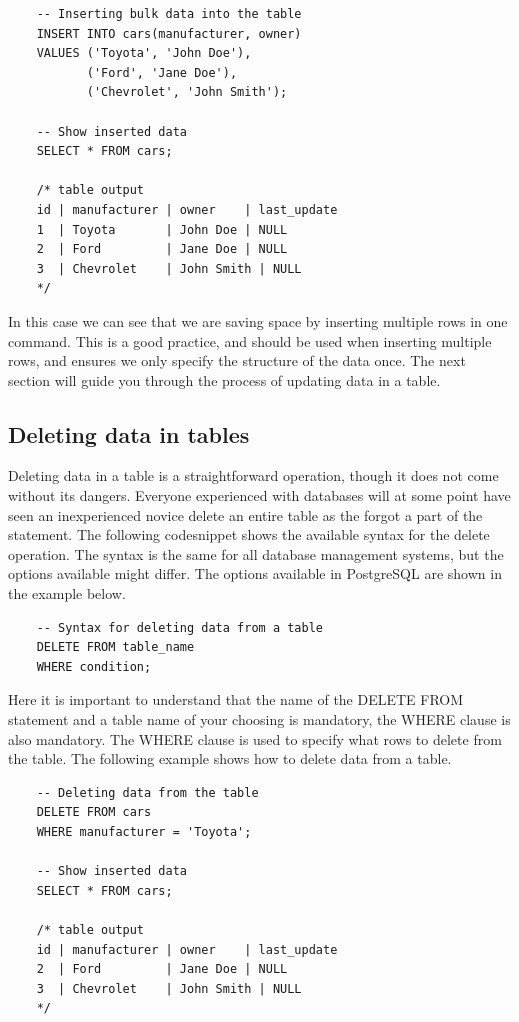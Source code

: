 \begin{verbatim}
    -- Inserting bulk data into the table
    INSERT INTO cars(manufacturer, owner)
    VALUES ('Toyota', 'John Doe'),
           ('Ford', 'Jane Doe'),
           ('Chevrolet', 'John Smith');

    -- Show inserted data
    SELECT * FROM cars;

    /* table output
    id | manufacturer | owner    | last_update
    1  | Toyota       | John Doe | NULL
    2  | Ford         | Jane Doe | NULL
    3  | Chevrolet    | John Smith | NULL
    */
\end{verbatim}

In this case we can see that we are saving space by inserting multiple rows in one command. This is a good practice, and should be used when inserting multiple rows, and ensures we only specify the structure of the data once. The next section will guide you through the process of updating data in a table.

\subsection{Deleting data in tables}
Deleting data in a table is a straightforward operation, though it does not come without its dangers. Everyone experienced with databases will at some point have seen an inexperienced novice delete an entire table as the forgot a part of the statement. The following codesnippet shows the available syntax for the delete operation. The syntax is the same for all database management systems, but the options available might differ. The options available in PostgreSQL are shown in the example below.

\begin{verbatim}
    -- Syntax for deleting data from a table
    DELETE FROM table_name
    WHERE condition;
\end{verbatim}

Here it is important to understand that the name of the DELETE FROM statement and a table name of your choosing is mandatory, the WHERE clause is also mandatory. The WHERE clause is used to specify what rows to delete from the table. The following example shows how to delete data from a table.

\begin{verbatim}
    -- Deleting data from the table
    DELETE FROM cars
    WHERE manufacturer = 'Toyota';

    -- Show inserted data
    SELECT * FROM cars;

    /* table output
    id | manufacturer | owner    | last_update
    2  | Ford         | Jane Doe | NULL
    3  | Chevrolet    | John Smith | NULL
    */
\end{verbatim}

